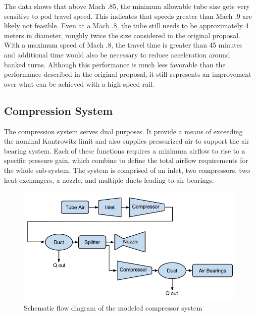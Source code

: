 \documentclass[heading.tex]{subfiles}
\begin{document}
The data shows that above Mach .85, the minimum allowable tube size gets very sensitive to pod travel speed. This indicates that speeds
greater than Mach .9 are likely not feasible. Even at a Mach .8, the tube still needs to be approximately 4 meters in diameter, roughly
twice the size considered in the original proposal. With a maximum speed of Mach .8, the travel time is greater than 45 minutes and
additional time would also be necessary to reduce acceleration around banked turns. Although this performance is much less favorable than the performance
described in the original proposal, it still represents an improvement over what can be achieved with a high speed rail.


\subsection{Compression System}

The compression system serves dual purposes. It provide a means of exceeding the nominal Kantrowitz limit
and also supplies pressurized air to support the air bearing system.
Each of these functions requires a minimum airflow to rise to a specific pressure gain,
which combine to define the total airflow requirements for the whole sub-system.
The system is comprised of an inlet, two compressors, two heat exchangers, a nozzle, and multiple ducts leading to air bearings.

\begin{figure}[hbtp]
\centering
\includegraphics[width=\textwidth]{images/compressor_schematic.png}
\caption{Schematic flow diagram of the modeled compressor system}
\end{figure}
\end{document}
